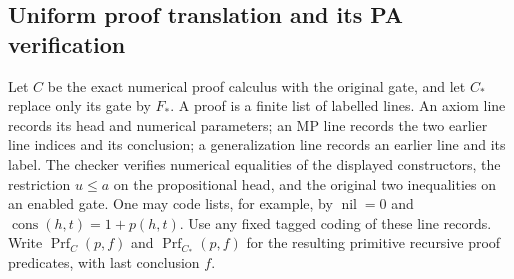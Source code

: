 \subsection{Uniform proof translation and its PA verification}

Let $C$ be the exact numerical proof calculus with the original gate,
and let $C_*$ replace only its gate by $F_*$. A proof is a finite list
of labelled lines. An axiom line records its head and numerical
parameters; an MP line records the two earlier line indices and its
conclusion; a generalization line records an earlier line and its
label. The checker verifies numerical equalities of the displayed
constructors, the restriction $u\leq a$ on the propositional head,
and the original two inequalities on an enabled gate. One may code
lists, for example, by $\operatorname{nil}=0$ and
$\operatorname{cons}(h,t)=1+p(h,t)$. Use any fixed tagged coding of
these line records. Write $\operatorname{Prf}_C(p,f)$ and
$\operatorname{Prf}_{C_*}(p,f)$ for the resulting primitive recursive
proof predicates, with last conclusion $f$.

